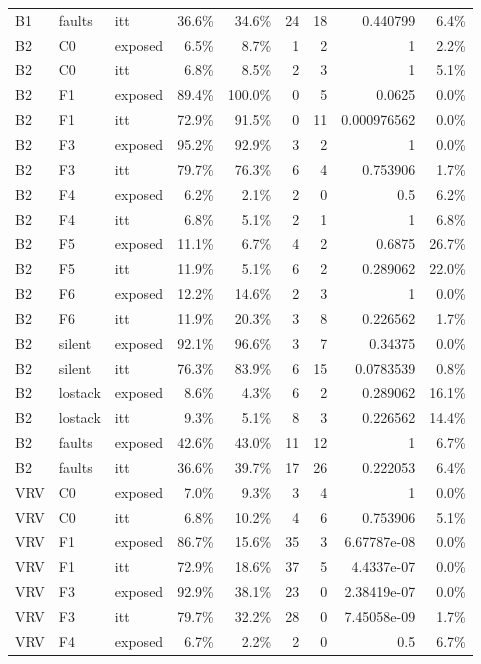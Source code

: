 \begin{tabular}{lllrrrrrr}
B1 & faults & itt & 36.6\% & 34.6\% & 24 & 18 & 0.440799 & 6.4\% \\
B2 & C0 & exposed & 6.5\% & 8.7\% & 1 & 2 & 1 & 2.2\% \\
B2 & C0 & itt & 6.8\% & 8.5\% & 2 & 3 & 1 & 5.1\% \\
B2 & F1 & exposed & 89.4\% & 100.0\% & 0 & 5 & 0.0625 & 0.0\% \\
B2 & F1 & itt & 72.9\% & 91.5\% & 0 & 11 & 0.000976562 & 0.0\% \\
B2 & F3 & exposed & 95.2\% & 92.9\% & 3 & 2 & 1 & 0.0\% \\
B2 & F3 & itt & 79.7\% & 76.3\% & 6 & 4 & 0.753906 & 1.7\% \\
B2 & F4 & exposed & 6.2\% & 2.1\% & 2 & 0 & 0.5 & 6.2\% \\
B2 & F4 & itt & 6.8\% & 5.1\% & 2 & 1 & 1 & 6.8\% \\
B2 & F5 & exposed & 11.1\% & 6.7\% & 4 & 2 & 0.6875 & 26.7\% \\
B2 & F5 & itt & 11.9\% & 5.1\% & 6 & 2 & 0.289062 & 22.0\% \\
B2 & F6 & exposed & 12.2\% & 14.6\% & 2 & 3 & 1 & 0.0\% \\
B2 & F6 & itt & 11.9\% & 20.3\% & 3 & 8 & 0.226562 & 1.7\% \\
B2 & silent & exposed & 92.1\% & 96.6\% & 3 & 7 & 0.34375 & 0.0\% \\
B2 & silent & itt & 76.3\% & 83.9\% & 6 & 15 & 0.0783539 & 0.8\% \\
B2 & lostack & exposed & 8.6\% & 4.3\% & 6 & 2 & 0.289062 & 16.1\% \\
B2 & lostack & itt & 9.3\% & 5.1\% & 8 & 3 & 0.226562 & 14.4\% \\
B2 & faults & exposed & 42.6\% & 43.0\% & 11 & 12 & 1 & 6.7\% \\
B2 & faults & itt & 36.6\% & 39.7\% & 17 & 26 & 0.222053 & 6.4\% \\
VRV & C0 & exposed & 7.0\% & 9.3\% & 3 & 4 & 1 & 0.0\% \\
VRV & C0 & itt & 6.8\% & 10.2\% & 4 & 6 & 0.753906 & 5.1\% \\
VRV & F1 & exposed & 86.7\% & 15.6\% & 35 & 3 & 6.67787e-08 & 0.0\% \\
VRV & F1 & itt & 72.9\% & 18.6\% & 37 & 5 & 4.4337e-07 & 0.0\% \\
VRV & F3 & exposed & 92.9\% & 38.1\% & 23 & 0 & 2.38419e-07 & 0.0\% \\
VRV & F3 & itt & 79.7\% & 32.2\% & 28 & 0 & 7.45058e-09 & 1.7\% \\
VRV & F4 & exposed & 6.7\% & 2.2\% & 2 & 0 & 0.5 & 6.7\% \\

\end{tabular}
